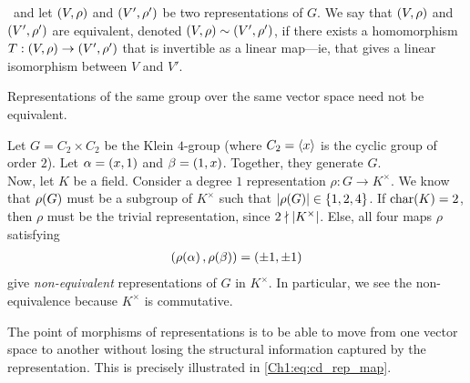 \begin{definition}
    \ and let $\left( V,\rho \right)$ and $\left( V',\rho' \right)$ be two representations of $G$. We say that $\left( V,\rho \right)$ and $\left( V',\rho' \right)$ are equivalent, denoted $\left( V,\rho \right) \sim \left( V',\rho' \right)$, if there exists a homomorphism $T : \left( V,\rho \right) \to \left( V',\rho' \right)$ that is invertible as a linear map---ie, that gives a linear isomorphism between $V$ and $V'$.
\end{definition}

Representations of the same group over the same vector space need not be equivalent.

\begin{boxexample}
    Let $G = C_2 \times C_2$ be the Klein $4$-group (where $C_2 = \left\langle x \right\rangle$ is the cyclic group of order $2$). Let $\alpha = \left( x, 1 \right)$ and $\beta = \left( 1, x \right)$. Together, they generate $G$. \\

    Now, let $K$ be a field. Consider a degree $1$ representation $\rho : G \to K^\times$. We know that $\rho\!\left( G \right)$ must be a subgroup of $K^\times$ such that $\left\lvert \rho\!\left( G \right) \right\rvert \in \left\{ 1, 2, 4 \right\}$. If $\operatorname{char}\!\left( K \right) = 2$, then $\rho$ must be the trivial representation, since $2 \nmid \left\lvert K^\times \right\rvert$. Else, all four maps $\rho$ satisfying
    \begin{align*}
        \left( \rho\!\left( \alpha \right), \rho\!\left( \beta \right) \right) = \left( \pm 1, \pm 1 \right)
    \end{align*}
    give \textit{non-equivalent} representations of $G$ in $K^\times$. In particular, we see the non-equivalence because $K^\times$ is commutative.
\end{boxexample}

The point of morphisms of representations is to be able to move from one vector space to another without losing the structural information captured by the representation. This is precisely illustrated in \eqref{Ch1:eq:cd_rep_map}.

